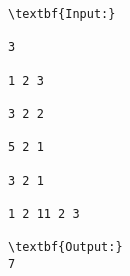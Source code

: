 \begin{verbatim}
\textbf{Input:}

3

1 2 3

3 2 2

5 2 1

3 2 1

1 2 11 2 3

\textbf{Output:}
7\end{verbatim}